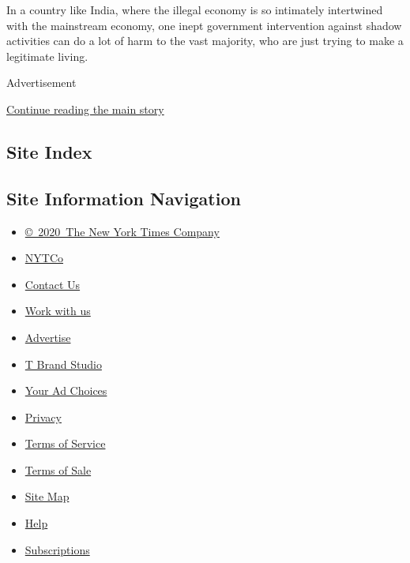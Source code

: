 In a country like India, where the illegal economy is so intimately
intertwined with the mainstream economy, one inept government
intervention against shadow activities can do a lot of harm to the vast
majority, who are just trying to make a legitimate living.

Advertisement

\protect\hyperlink{after-bottom}{Continue reading the main story}

\hypertarget{site-index}{%
\subsection{Site Index}\label{site-index}}

\hypertarget{site-information-navigation}{%
\subsection{Site Information
Navigation}\label{site-information-navigation}}

\begin{itemize}
\tightlist
\item
  \href{https://help.nytimes.com/hc/en-us/articles/115014792127-Copyright-notice}{©~2020~The
  New York Times Company}
\end{itemize}

\begin{itemize}
\tightlist
\item
  \href{https://www.nytco.com/}{NYTCo}
\item
  \href{https://help.nytimes.com/hc/en-us/articles/115015385887-Contact-Us}{Contact
  Us}
\item
  \href{https://www.nytco.com/careers/}{Work with us}
\item
  \href{https://nytmediakit.com/}{Advertise}
\item
  \href{http://www.tbrandstudio.com/}{T Brand Studio}
\item
  \href{https://www.nytimes.com/privacy/cookie-policy\#how-do-i-manage-trackers}{Your
  Ad Choices}
\item
  \href{https://www.nytimes.com/privacy}{Privacy}
\item
  \href{https://help.nytimes.com/hc/en-us/articles/115014893428-Terms-of-service}{Terms
  of Service}
\item
  \href{https://help.nytimes.com/hc/en-us/articles/115014893968-Terms-of-sale}{Terms
  of Sale}
\item
  \href{https://spiderbites.nytimes.com}{Site Map}
\item
  \href{https://help.nytimes.com/hc/en-us}{Help}
\item
  \href{https://www.nytimes.com/subscription?campaignId=37WXW}{Subscriptions}
\end{itemize}
